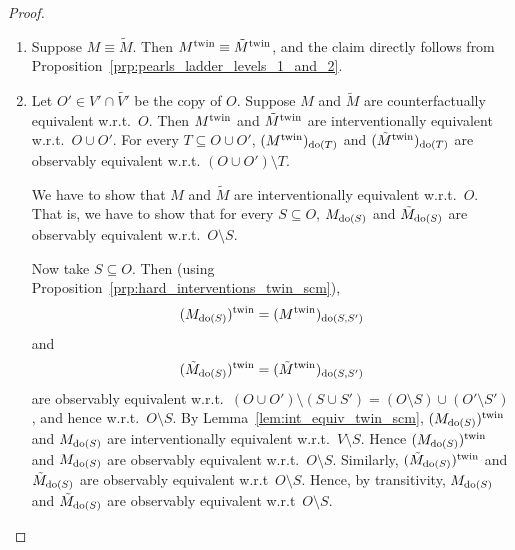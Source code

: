 \begin{proof}
  \begin{enumerate}
    \item 
     Suppose $M \equiv \tilde{M}$. 
     Then $M^{\mathrm{twin}} \equiv \tilde{M}^{\mathrm{twin}}$, and the claim directly follows from Proposition~\ref{prp:pearls_ladder_levels_1_and_2}.

  \item 
  Let $O' \in V' \cap \tilde{V'}$ be the copy of $O$.
    Suppose $M$ and $\tilde{M}$ are counterfactually equivalent w.r.t.\ $O$. 
    Then $M^{\mathrm{twin}}$ and $\tilde{M}^{\mathrm{twin}}$ are interventionally equivalent w.r.t.\ $O \cup O'$. 
  For every $T \subseteq O \cup O'$,
  $(M^{\mathrm{twin}})_{\operatorname{do}(T)}$ and $(\tilde{M}^{\mathrm{twin}})_{\operatorname{do}(T)}$ are observably equivalent w.r.t. $(O \cup O') \setminus T$.

  We have to show that $M$ and $\tilde{M}$ are interventionally equivalent w.r.t.\ $O$.
  That is, we have to show that for every $S \subseteq O$, $M_{\operatorname{do}(S)}$ and $\tilde{M}_{\operatorname{do}(S)}$
  are observably equivalent w.r.t.\ $O \setminus S$.


  Now take $S \subseteq O$. Then (using Proposition~\ref{prp:hard_interventions_twin_scm}),
  $$(M_{\operatorname{do}(S)})^{\mathrm{twin}} = (M^{\mathrm{twin}})_{\operatorname{do}(S,S')}$$
  and 
  $$(\tilde{M}_{\operatorname{do}(S)})^{\mathrm{twin}} = (\tilde{M}^{\mathrm{twin}})_{\operatorname{do}(S,S')}$$
  are observably equivalent w.r.t.\ $(O \cup O') \setminus (S \cup S') = (O \setminus S) \cup (O' \setminus S')$, and hence w.r.t.\ $O \setminus S$.
  By Lemma~\ref{lem:int_equiv_twin_scm}, $(M_{\operatorname{do}(S)})^{\mathrm{twin}}$ and $M_{\operatorname{do}(S)}$ are interventionally equivalent w.r.t.\ $V \setminus S$. 
  Hence $(M_{\operatorname{do}(S)})^{\mathrm{twin}}$ and $M_{\operatorname{do}(S)}$ are observably equivalent w.r.t.\ $O \setminus S$.
  Similarly, $(\tilde{M}_{\operatorname{do}(S)})^{\mathrm{twin}}$ and $\tilde{M}_{\operatorname{do}(S)}$ are observably equivalent w.r.t\ $O \setminus S$.
  Hence, by transitivity, $M_{\operatorname{do}(S)}$ and $\tilde{M}_{\operatorname{do}(S)}$ are observably equivalent w.r.t\ $O \setminus S$.
  \end{enumerate}
\end{proof}
